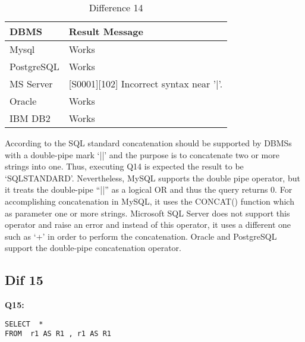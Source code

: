 \begin{table}[h]
\centering
\caption{Difference 14}
\label{my-label}
\begin{tabular}{|p{2cm}|p{11.5cm}| }
\hline
\textbf{DBMS} & \textbf{Result Message}                         \\ \hline
Mysql         & Works                                           \\ \hline
PostgreSQL    & Works                                           \\ \hline
MS Server     & {[}S0001{]}{[}102{]} Incorrect syntax near '|'. \\ \hline
Oracle        & Works                                           \\ \hline
IBM DB2       & Works                                           \\ \hline
\end{tabular}
\end{table}

According to the SQL standard concatenation should be supported by DBMSs with a double-pipe mark ‘||’ and the purpose is to concatenate two or more strings into one. Thus, executing Q14 is expected the result to be ‘SQLSTANDARD’. Nevertheless, MySQL supports the double pipe operator, but it treats the double-pipe “||” as a logical OR and thus the query returns 0. For accomplishing concatenation in MySQL, it uses the CONCAT() function which as parameter one or more strings.   Microsoft SQL Server does not support this operator and raise an error and instead of this operator, it uses a different one such as ‘+’  in order to perform the concatenation. Oracle and PostgreSQL support the double-pipe  concatenation operator. 



\subsection{Dif 15}
\textbf{Q15:}
\begin{mdframed}[backgroundcolor=lightgray!20]
\begin{lstlisting}[style=SQL]
SELECT  *
FROM  r1 AS R1 , r1 AS R1
\end{lstlisting}
\end{mdframed}

